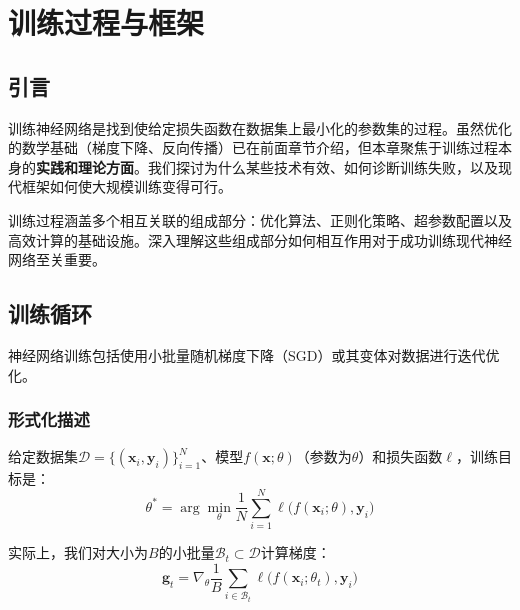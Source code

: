\clearpage
\cleardoublepage

\chapter{训练过程与框架}

\section{引言}

训练神经网络是找到使给定损失函数在数据集上最小化的参数集的过程。虽然优化的数学基础（梯度下降、反向传播）已在前面章节介绍，但本章聚焦于训练过程本身的\textbf{实践和理论方面}。我们探讨为什么某些技术有效、如何诊断训练失败，以及现代框架如何使大规模训练变得可行。

训练过程涵盖多个相互关联的组成部分：优化算法、正则化策略、超参数配置以及高效计算的基础设施。深入理解这些组成部分如何相互作用对于成功训练现代神经网络至关重要。

\section{训练循环}

神经网络训练包括使用小批量随机梯度下降（SGD）或其变体对数据进行迭代优化。

\subsection{形式化描述}

给定数据集$\mathcal{D} = \{(\mathbf{x}_i, \mathbf{y}_i)\}_{i=1}^{N}$、模型$f(\mathbf{x}; \theta)$（参数为$\theta$）和损失函数$\ell$，训练目标是：
\begin{equation}
\theta^* = \arg\min_{\theta} \frac{1}{N}\sum_{i=1}^{N} \ell\bigl(f(\mathbf{x}_i; \theta), \mathbf{y}_i\bigr)
\end{equation}

实际上，我们对大小为$B$的小批量$\mathcal{B}_t \subset \mathcal{D}$计算梯度：
\begin{equation}
\mathbf{g}_t = \nabla_\theta \frac{1}{B}\sum_{i \in \mathcal{B}_t} \ell\bigl(f(\mathbf{x}_i; \theta_t), \mathbf{y}_i\bigr)
\end{equation}

